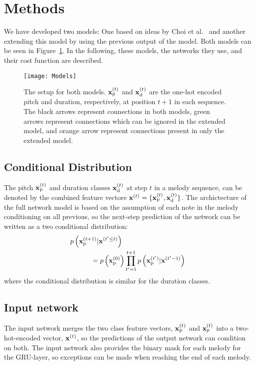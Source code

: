 \section{Methods}
\label{sec:method}

We have developed two models:
One based on ideas by Choi et al.\ \cite{Choi2015} and another extending this model by using the previous output of the model.
Both models can be seen in Figure~\ref{fig:methods:models}.
In the following, these models, the networks they use, and their cost function are described.

\begin{figure*}
	\centering
	\texttt{[image: Models]}
	\caption{The setup for both models. $\bm{\mathrm{x}}^{(t)}_{\text{p}}$ and $\bm{\mathrm{x}}^{(t)}_{\text{d}}$ are the one-hot encoded pitch and duration, respectively, at position $t + 1$ in each sequence. The black arrows represent connections in both models, green arrows represent connections which can be ignored in the extended model, and orange arrow represent connections present in only the extended model.}
	\label{fig:methods:models}
\end{figure*}

\subsection{Conditional Distribution} %
\label{sub:conditional_distribution}
	The pitch $\bm{\mathrm{x}}^{(t)}_{\text{p}}$ and duration classes $\bm{\mathrm{x}}^{(t)}_{\text{d}}$ at step $t$ in a melody sequence, can be denoted by the combined feature vectore $\bm{\mathrm{x}}^{(t)}=\{\bm{\mathrm{x}}^{(t)}_{\text{p}},\bm{\mathrm{x}}^{(t)}_{\text{d}}\}$.	
	The archictecture of the full network model is based on the assumption of each note in the melody conditioning on all previous, so the next-step prediction of the network can be written as a two conditional distribution:
	\begin{gather}
		\begin{split}
		\MoveEqLeft[3]
				p\left(\vec{x}\order{t+1}\idx{p}|\vec{x}\order{t'\le t}\right) \\ 
				& = p\left(\vec{x}\order{0}\idx{p}\right) \prod^{t+1}_{t'=1} p\left(\vec{x}\order{t'}\idx{p}|\vec{x}\order{t'-1}\right) \label{}
		\end{split} 	
	\end{gather}
	where the conditional distribution is similar for the duration classes.

\subsection{Input network} %
\label{sub:input_network}
The input network merges the two class feature vectors, $\bm{\mathrm{x}}^{(t)}_{\text{p}}$ and $\bm{\mathrm{x}}^{(t)}_{\text{p}}$ into a two-hot-encoded vector, $\bm{\mathrm{x}}^{(t)}$, so the predictions of the output network can condition on both. The input network also provides the binary mask for each melody for the GRU-layer, so exceptions can be made when reaching the end of each melody.

